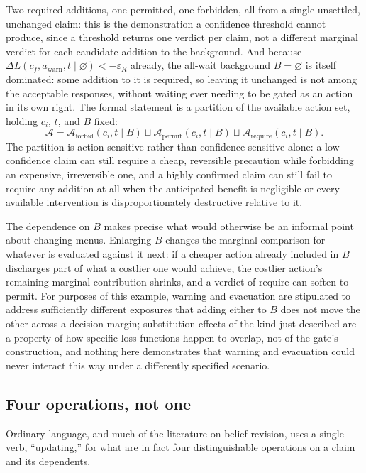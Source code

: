 \documentclass[11pt]{article}
\begin{document}
Two required additions, one permitted, one forbidden, all from a single unsettled, unchanged claim: this is the demonstration a confidence threshold cannot produce, since a threshold returns one verdict per claim, not a different marginal verdict for each candidate addition to the background. And because $\Delta L(c_f, a_{\mathrm{warn}}, t \mid \varnothing) < -\varepsilon_R$ already, the all-wait background $B = \varnothing$ is itself dominated: some addition to it is required, so leaving it unchanged is not among the acceptable responses, without waiting ever needing to be gated as an action in its own right. The formal statement is a partition of the available action set, holding $c_i$, $t$, and $B$ fixed:
\[
\mathcal{A} = \mathcal{A}_{\mathrm{forbid}}(c_i, t \mid B) \sqcup \mathcal{A}_{\mathrm{permit}}(c_i, t \mid B) \sqcup \mathcal{A}_{\mathrm{require}}(c_i, t \mid B).
\]
The partition is action-sensitive rather than confidence-sensitive alone: a low-confidence claim can still require a cheap, reversible precaution while forbidding an expensive, irreversible one, and a highly confirmed claim can still fail to require any addition at all when the anticipated benefit is negligible or every available intervention is disproportionately destructive relative to it.

The dependence on $B$ makes precise what would otherwise be an informal point about changing menus. Enlarging $B$ changes the marginal comparison for whatever is evaluated against it next: if a cheaper action already included in $B$ discharges part of what a costlier one would achieve, the costlier action's remaining marginal contribution shrinks, and a verdict of require can soften to permit. For purposes of this example, warning and evacuation are stipulated to address sufficiently different exposures that adding either to $B$ does not move the other across a decision margin; substitution effects of the kind just described are a property of how specific loss functions happen to overlap, not of the gate's construction, and nothing here demonstrates that warning and evacuation could never interact this way under a differently specified scenario.

\subsection{Four operations, not one}
\label{sec:four-operations}

Ordinary language, and much of the literature on belief revision, uses a single verb, ``updating,'' for what are in fact four distinguishable operations on a claim and its dependents.
\end{document}
